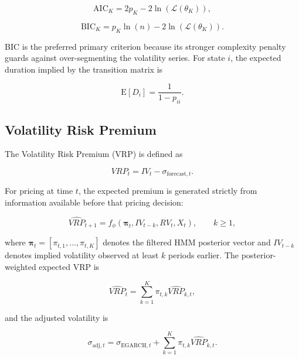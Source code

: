 \documentclass[journal]{IEEEtran}
\begin{document}
\begin{equation}
\mathrm{AIC}_K = 2p_K - 2\ln\!\left(\mathcal{L}(\theta_K)\right),
\end{equation}

\begin{equation}
\mathrm{BIC}_K = p_K\ln(n) - 2\ln\!\left(\mathcal{L}(\theta_K)\right).
\end{equation}

BIC is the preferred primary criterion because its stronger complexity
penalty guards against over-segmenting the volatility series. For
state $i$, the expected duration implied by the transition matrix is

\begin{equation}
\mathrm{E}[D_i] = \frac{1}{1-p_{ii}}.
\end{equation}

\subsection{Volatility Risk Premium}

The Volatility Risk Premium (VRP) is defined as

\begin{equation}
VRP_t = IV_t - \sigma_{\mathrm{forecast},t}.
\end{equation}

For pricing at time $t$, the expected premium is generated strictly
from information available before that pricing decision:

\begin{equation}
\label{eq:lagged_vrp}
\widehat{VRP}_{t+1} = f_{\phi}\!\left(\boldsymbol{\pi}_t,
IV_{t-k}, RV_t, X_t\right), \qquad k\geq 1,
\end{equation}

where $\boldsymbol{\pi}_t=[\pi_{t,1},\ldots,\pi_{t,K}]$ denotes the
filtered HMM posterior vector and $IV_{t-k}$ denotes implied
volatility observed at least $k$ periods earlier. The posterior-weighted
expected VRP is

\begin{equation}
\label{eq:posterior_weighted_vrp}
\widehat{VRP}_{t}=\sum_{k=1}^{K}\pi_{t,k}\widehat{VRP}_{k,t},
\end{equation}

and the adjusted volatility is

\begin{equation}
\label{eq:adjusted_lagged_vrp}
\sigma_{\mathrm{adj},t} = \sigma_{\mathrm{EGARCH},t}
+ \sum_{k=1}^{K}\pi_{t,k}\widehat{VRP}_{k,t}.
\end{equation}
\end{document}
